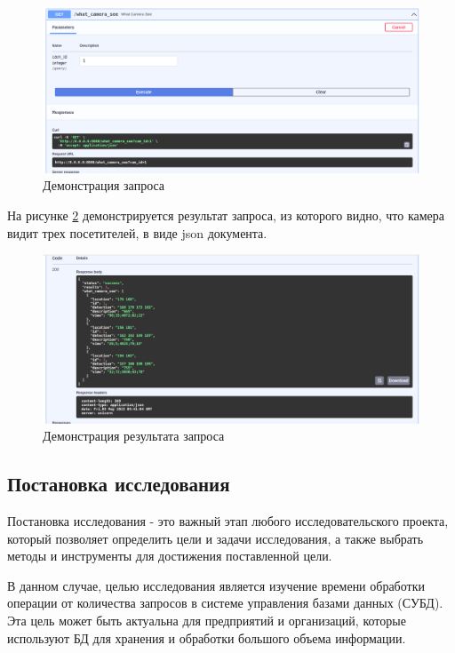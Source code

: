 \begin{figure}[ht!]
	\centering
	\includegraphics[width=0.9\linewidth]{assets/images/demon-1-cam.png}
	\caption{Демонстрация запроса}
	\label{fig:i:hate:niggers}
\end{figure}
\FloatBarrier

На рисунке \ref{fig:i:hate:niggers2} демонстрируется результат запроса, из которого видно, что камера видит трех посетителей, в виде json документа. 

\begin{figure}[ht!]
	\centering
	\includegraphics[width=0.9\linewidth]{assets/images/demon-2-cam.png}
	\caption{Демонстрация результата запроса}
	\label{fig:i:hate:niggers2}
\end{figure}
\FloatBarrier


\subsection{Постановка исследования}

Постановка исследования - это важный этап любого исследовательского проекта, который позволяет определить цели и задачи исследования, а также выбрать методы и инструменты для достижения поставленной цели.

В данном случае, целью исследования является изучение времени обработки операции от количества запросов в системе управления базами данных (СУБД). Эта цель может быть актуальна для предприятий и организаций, которые используют БД для хранения и обработки большого объема информации.

